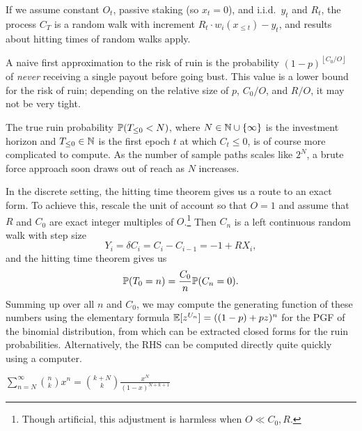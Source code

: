If we assume constant $O_t$, passive staking (so $x_t = 0$), and i.i.d.~$y_t$ and $R_t$, the process $C_T$ is a random walk with increment $R_t\cdot w_i(x_{\leq t}) - y_t$, and results about hitting times of random walks apply.

\begin{example}
  
  A naive first approximation to the risk of ruin is the probability $(1-p)^{\left\lfloor C_0/O \right\rfloor}$ of \emph{never} receiving a single payout before going bust.
  This value is a lower bound for the risk of ruin; depending on the relative size of $p$, $C_0/O$, and $R/O$, it may not be very tight.
  
\end{example}

    The true ruin probability $\mathbb{P}(T_{\leq 0}<N)$, where $N\in\mathbb{N}\cup\{\infty\}$ is the investment horizon and $T_{\leq 0}\in\mathbb{N}$ is the first epoch $t$ at which $C_t\leq 0$, is of course more complicated to compute.
    As the number of sample paths scales like $2^N$, a brute force approach soon draws out of reach as $N$ increases.

    In the discrete setting, the hitting time theorem gives us a route to an exact form.
    To achieve this, rescale the unit of account so that $O=1$ and assume that $R$ and $C_0$ are exact integer multiples of $O$.\footnote{Though artificial, this adjustment is harmless when $O\ll C_0,R$.}
    Then $C_n$ is a left continuous random walk with step size
    \[
      Y_i = \delta C_i = C_i - C_{i-1} = - 1 + RX_i,
    \] 
    and the hitting time theorem gives us
    \[
      \mathbb{P}(T_0 = n) = \frac{C_0}{n}\mathbb{P}(C_n = 0).
    \]
Summing up over all $n$ and $C_0$, we may compute the generating function of these numbers using the elementary formula $\mathbb{E}[z^{U_n}] = ((1-p) + pz)^n$ for the PGF of the binomial distribution, from which can be extracted closed forms for the ruin probabilities.
%
Alternatively, the RHS can be computed directly quite quickly using a computer.    

    
\begin{lemma}

  $\sum_{n=N}^\infty { n\choose k } x^n = {k+N \choose k} \frac{x^N}{(1-x)^{N+k+1}}$

\end{lemma}

